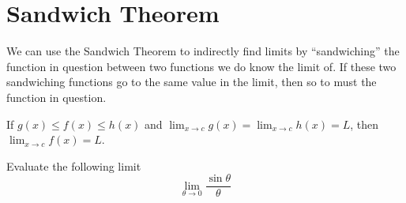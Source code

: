 \section{Sandwich Theorem}
We can use the Sandwich Theorem to indirectly find limits by ``sandwiching'' the function in question between two functions we do know the limit of.
If these two sandwiching functions go to the same value in the limit, then so to must the function in question.
\begin{theorem}
	If $g(x) \leq f(x) \leq h(x)$ and $\lim_{x \to c}{g(x)} = \lim_{x\to c}{h(x)} = L$, then $\lim_{x \to c}{f(x)} = L$.
\end{theorem}

\begin{example}
	Evaluate the following limit
	\begin{equation*}
		\lim_{\theta \to 0}{\frac{\sin{\theta}}{\theta}}
	\end{equation*}
\end{example}
